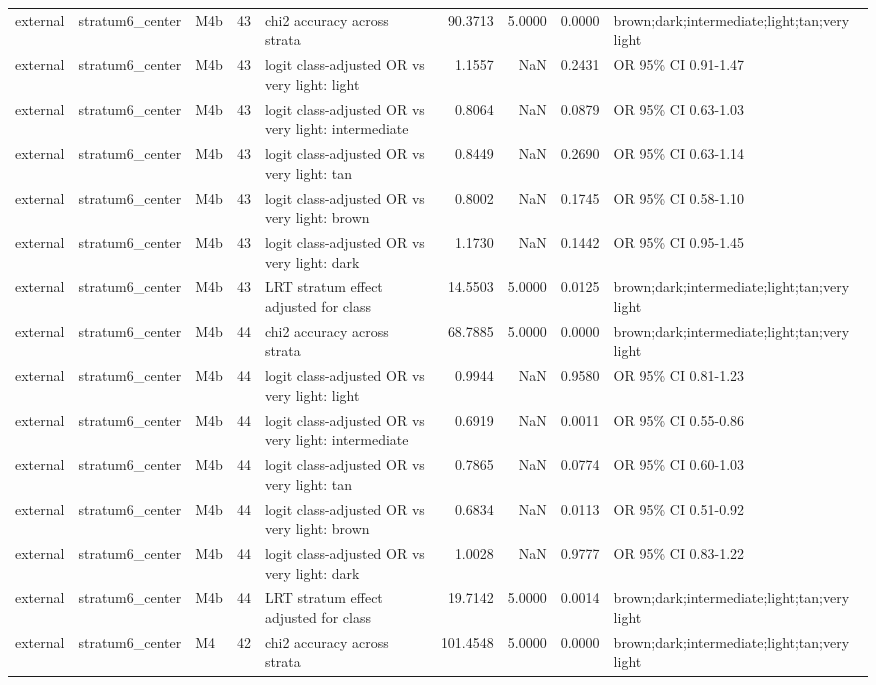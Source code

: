 \begin{tabular}{lllrlrrrl}
external & stratum6\_center & M4b & 43 & chi2 accuracy across strata & 90.3713 & 5.0000 & 0.0000 & brown;dark;intermediate;light;tan;very light \\
external & stratum6\_center & M4b & 43 & logit class-adjusted OR vs very light: light & 1.1557 & NaN & 0.2431 & OR 95\% CI 0.91-1.47 \\
external & stratum6\_center & M4b & 43 & logit class-adjusted OR vs very light: intermediate & 0.8064 & NaN & 0.0879 & OR 95\% CI 0.63-1.03 \\
external & stratum6\_center & M4b & 43 & logit class-adjusted OR vs very light: tan & 0.8449 & NaN & 0.2690 & OR 95\% CI 0.63-1.14 \\
external & stratum6\_center & M4b & 43 & logit class-adjusted OR vs very light: brown & 0.8002 & NaN & 0.1745 & OR 95\% CI 0.58-1.10 \\
external & stratum6\_center & M4b & 43 & logit class-adjusted OR vs very light: dark & 1.1730 & NaN & 0.1442 & OR 95\% CI 0.95-1.45 \\
external & stratum6\_center & M4b & 43 & LRT stratum effect adjusted for class & 14.5503 & 5.0000 & 0.0125 & brown;dark;intermediate;light;tan;very light \\
external & stratum6\_center & M4b & 44 & chi2 accuracy across strata & 68.7885 & 5.0000 & 0.0000 & brown;dark;intermediate;light;tan;very light \\
external & stratum6\_center & M4b & 44 & logit class-adjusted OR vs very light: light & 0.9944 & NaN & 0.9580 & OR 95\% CI 0.81-1.23 \\
external & stratum6\_center & M4b & 44 & logit class-adjusted OR vs very light: intermediate & 0.6919 & NaN & 0.0011 & OR 95\% CI 0.55-0.86 \\
external & stratum6\_center & M4b & 44 & logit class-adjusted OR vs very light: tan & 0.7865 & NaN & 0.0774 & OR 95\% CI 0.60-1.03 \\
external & stratum6\_center & M4b & 44 & logit class-adjusted OR vs very light: brown & 0.6834 & NaN & 0.0113 & OR 95\% CI 0.51-0.92 \\
external & stratum6\_center & M4b & 44 & logit class-adjusted OR vs very light: dark & 1.0028 & NaN & 0.9777 & OR 95\% CI 0.83-1.22 \\
external & stratum6\_center & M4b & 44 & LRT stratum effect adjusted for class & 19.7142 & 5.0000 & 0.0014 & brown;dark;intermediate;light;tan;very light \\
external & stratum6\_center & M4 & 42 & chi2 accuracy across strata & 101.4548 & 5.0000 & 0.0000 & brown;dark;intermediate;light;tan;very light \\

\end{tabular}

